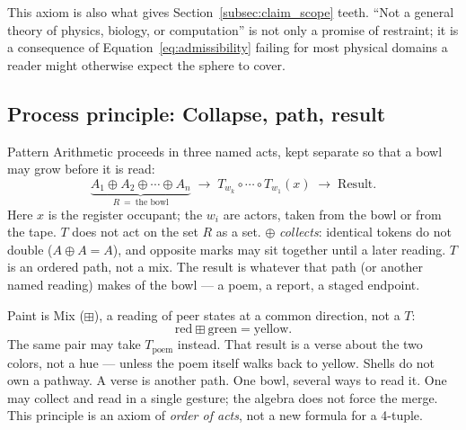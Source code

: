 \documentclass[12pt, a4paper]{article}
\begin{document}
This axiom is also what gives
Section~\ref{subsec:claim_scope} teeth. ``Not a general theory of
physics, biology, or computation'' is not only a promise of
restraint; it is a consequence of Equation~\eqref{eq:admissibility}
failing for most physical domains a reader might otherwise expect
the sphere to cover.

\subsection{Process principle: Collapse, path, result}
\label{subsec:process_principle}
Pattern Arithmetic proceeds in three named acts, kept separate so that a bowl may grow before it is read:
\begin{equation}
    \underbrace{A_1 \oplus A_2 \oplus \cdots \oplus A_n}_{R\ =\ \text{the bowl}}
    \;\longrightarrow\;
    T_{w_k}\circ \cdots \circ T_{w_1}(x)
    \;\longrightarrow\;
    \text{Result}.
    \label{eq:pipeline}
\end{equation}
Here $x$ is the register occupant; the $w_i$ are actors, taken from
the bowl or from the tape. $T$ does not act on the set $R$ as a set.
$\oplus$ \emph{collects}: identical tokens do not double ($A \oplus A = A$), and opposite marks may sit together until a later reading. $T$ is an ordered path, not a mix. The result is whatever that path (or another named reading) makes of the bowl --- a poem, a report, a staged endpoint.

Paint is Mix ($\boxplus$), a reading of peer states at a common direction, not a $T$:
\[
\mathrm{red}\boxplus\mathrm{green} = \mathrm{yellow}.
\]
The same pair may take $T_{\mathrm{poem}}$ instead. That result is a
verse about the two colors, not a hue --- unless the poem itself
walks back to yellow. Shells do not own a pathway. A verse is another
path. One bowl, several ways to read it. One may collect
and read in a single gesture; the algebra does not force the merge.
This principle is an axiom of \emph{order of acts}, not a new formula
for a 4-tuple.
\end{document}

